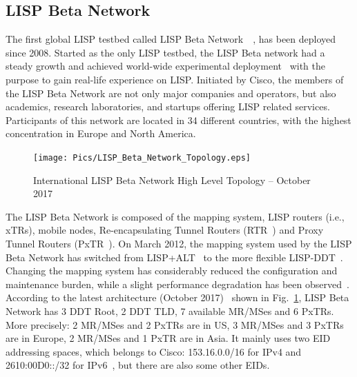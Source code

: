 \subsection{LISP Beta Network}
\label{subsec:platform_beta}

The first global LISP testbed called LISP Beta Network~\cite{lispbeta}~\cite{coras2014performance}, has been deployed since 2008. Started as the only LISP testbed, the LISP Beta network had a steady growth and achieved world-wide experimental deployment~\cite{lispCCR} with the purpose to gain real-life experience on LISP. Initiated by Cisco, the members of the LISP Beta Network are not only major companies and operators, but also academics, research laboratories, and startups offering LISP related services. Participants of this network are located in 34 different countries, with the highest concentration in Europe and North America.

\begin{figure}[!t]
	\centering
	\texttt{[image: Pics/LISP\_Beta\_Network\_Topology.eps]}
	\caption{International LISP Beta Network High Level Topology – October 2017~\cite{lispbetaarchi}}
	\label{LISP_Beta_Network_Topology}
\end{figure}
The LISP Beta Network is composed of the mapping system, LISP routers (i.e., xTRs), mobile nodes, Re-encapsulating Tunnel Routers (RTR~\cite{ermagan2016nat}) and Proxy Tunnel Routers (PxTR~\cite{rfc6832}). On March  2012, the mapping system used by the LISP Beta Network has switched from LISP+ALT~\cite{rfc6836} to the more flexible LISP-DDT~\cite{lispDDT}. Changing the  mapping system has considerably reduced the configuration and maintenance burden, while a slight performance degradation has been observed~\cite{lispCCR}. According to the latest architecture (October 2017)~\cite{lispbetaarchi} shown in Fig.~\ref{LISP_Beta_Network_Topology}, LISP Beta Network has 3 DDT Root, 2 DDT TLD, 7 available MR/MSes and 6 PxTRs. More precisely: 2 MR/MSes and 2 PxTRs are in US, 3 MR/MSes and 3 PxTRs are in Europe, 2 MR/MSes and 1 PxTR are in Asia. It mainly uses two EID addressing spaces, which belongs to Cisco: 153.16.0.0/16 for IPv4 and 2610:00D0::/32 for IPv6~\cite{lispCCR}, but there are also some other EIDs. %



